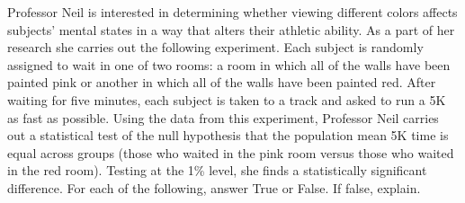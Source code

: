 \documentclass[addpoints,12pt]{exam}\usepackage[]{graphicx}\usepackage[]{color}
\begin{document}
\begin{questions}
\question  Professor Neil is interested in determining whether viewing different colors affects subjects' mental states in a way that alters their athletic ability. As a part of her research she carries out the following experiment. Each subject is randomly assigned to wait in one of two rooms: a room in which all of the walls have been painted pink or another in which all of the walls have been painted red. After waiting for five minutes, each subject is taken to a track and asked to run a 5K as fast as possible. Using the data from this experiment, Professor Neil carries out a statistical test of the null hypothesis that the population mean 5K time is equal across groups (those who waited in the pink room versus those who waited in the red room). Testing at the 1\% level, she finds a statistically significant difference. For each of the following, answer True or False. If false, explain.
\end{questions}
\end{document}
